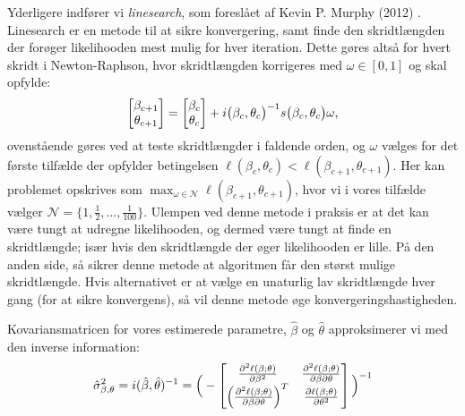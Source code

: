 \documentclass[11pt,a4paper]{article}
\begin{document}
Yderligere indfører vi \textit{linesearch}, som foreslået af Kevin P. Murphy (2012) \cite{LineSearch}. Linesearch er en metode til at sikre konvergering, samt finde den skridtlængden der forøger likelihooden mest mulig for hver iteration. Dette gøres altså for hvert skridt i Newton-Raphson, hvor skridtlængden korrigeres med $\omega \in [0,1]$ og skal opfylde:\\
\begin{align*}
\begin{bmatrix} \beta_{c+1}\\\theta_{c+1}\end{bmatrix} = \begin{bmatrix} \beta_c\\\theta_c\end{bmatrix} + i\big{(}\beta_c,\theta_c\big{)}^{-1}s\big{(}\beta_c,\theta_c\big{)}\omega,
\end{align*}
ovenstående gøres ved at teste skridtlængder i faldende orden, og $\omega$ vælges for det første tilfælde der opfylder betingelsen $\ell(\beta_c,\theta_c)<\ell(\beta_{c+1},\theta_{c+1})$. 
Her kan problemet opskrives som 
$\max_{\omega \in \mathcal{N}} \ell(\beta_{c+1},\theta_{c+1})$, hvor vi i vores tilfælde vælger 
$\mathcal{N} = \{1,\frac{1}{2},...,\frac{1}{100}\}$. Ulempen ved denne metode i praksis er at det kan være tungt at udregne likelihooden, og dermed være tungt at finde en skridtlængde; især hvis den skridtlængde der øger likelihooden er lille. På den anden side, så sikrer denne metode at algoritmen får den størst mulige skridtlængde. Hvis alternativet er at vælge en unaturlig lav skridtlængde hver gang (for at sikre konvergens), så vil denne metode øge konvergeringshastigheden.\\\par
Kovariansmatricen for vores estimerede parametre, $\hat{\beta}$ og $\hat{\theta}$ approksimerer vi med den inverse information: 
\begin{align*}
&\hat{\sigma}^2_{\beta,\theta}=i(\hat{\beta},\hat{\theta})^{-1}=
\Big{(}-\begin{bmatrix}
\frac{\partial^2 \ell(\beta;\theta)}{\partial \beta^2} &\frac{\partial^2 \ell(\beta;\theta)}{\partial \beta \partial \theta} \\
\Big{(}\frac{\partial^2 \ell(\beta;\theta)}{\partial \beta \partial \theta}\Big{)}^T & \frac{\partial \ell(\beta;\theta)}{\partial \theta^2}
\end{bmatrix}\Big{)}^{-1}\\
\end{align*}
\end{document}
